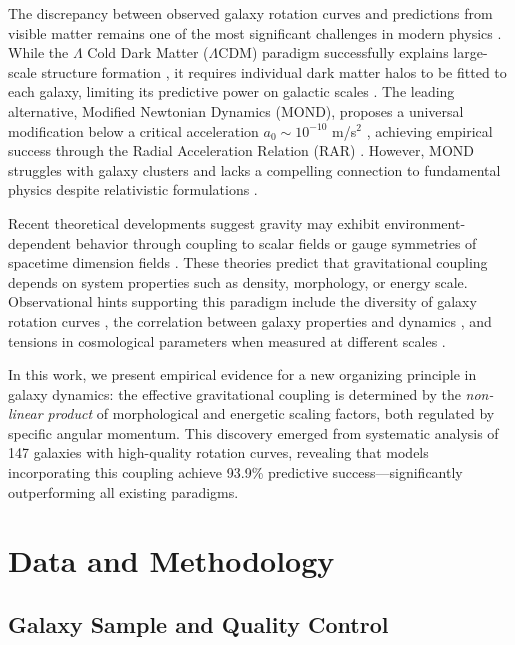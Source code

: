 \documentclass[aps,prd,twocolumn,superscriptaddress,nofootinbib,longbibliography]{revtex4-2}
\begin{document}
The discrepancy between observed galaxy rotation curves and predictions from visible matter remains one of the most significant challenges in modern physics \cite{Zwicky1933,Rubin1980,Rubin1983}. While the $\Lambda$ Cold Dark Matter ($\Lambda$CDM) paradigm successfully explains large-scale structure formation \cite{Planck2020,DESI2024}, it requires individual dark matter halos to be fitted to each galaxy, limiting its predictive power on galactic scales \cite{Bullock2017,Sales2022}. The leading alternative, Modified Newtonian Dynamics (MOND), proposes a universal modification below a critical acceleration $a_0 \sim 10^{-10}$ m/s$^2$ \cite{Milgrom1983,Famaey2012}, achieving empirical success through the Radial Acceleration Relation (RAR) \cite{McGaugh2016,Lelli2017}. However, MOND struggles with galaxy clusters \cite{Angus2008} and lacks a compelling connection to fundamental physics despite relativistic formulations \cite{Bekenstein2004,Skordis2021}.

Recent theoretical developments suggest gravity may exhibit environment-dependent behavior through coupling to scalar fields \cite{Khoury2004,Brax2021} or gauge symmetries of spacetime dimension fields \cite{Partanen2025}. These theories predict that gravitational coupling depends on system properties such as density, morphology, or energy scale. Observational hints supporting this paradigm include the diversity of galaxy rotation curves \cite{Oman2015}, the correlation between galaxy properties and dynamics \cite{Lelli2016SPARC}, and tensions in cosmological parameters when measured at different scales \cite{Riess2022,DiValentino2021}.

In this work, we present empirical evidence for a new organizing principle in galaxy dynamics: the effective gravitational coupling is determined by the \textit{non-linear product} of morphological and energetic scaling factors, both regulated by specific angular momentum. This discovery emerged from systematic analysis of 147 galaxies with high-quality rotation curves, revealing that models incorporating this coupling achieve 93.9\% predictive success—significantly outperforming all existing paradigms.

\section{Data and Methodology}

\subsection{Galaxy Sample and Quality Control}
\end{document}
